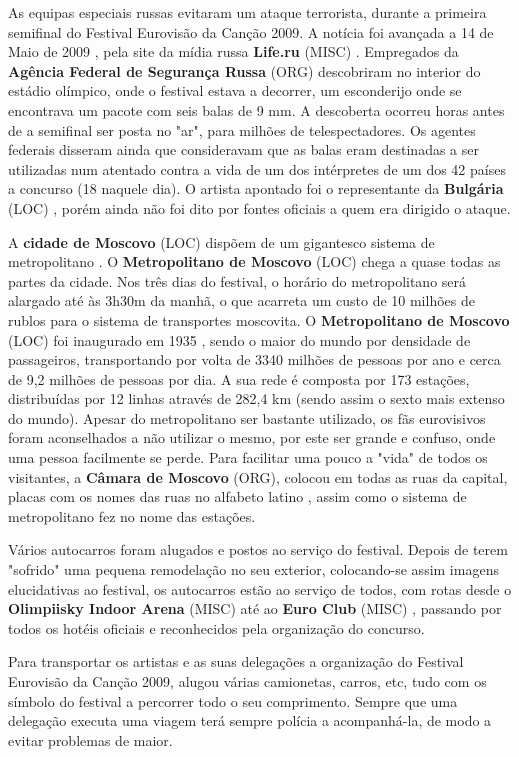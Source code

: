 \documentclass[12pt,a4paper]{article}
\begin{document}
As equipas especiais russas evitaram um ataque terrorista, durante a primeira semifinal do Festival Eurovisão da Canção 2009. A notícia foi avançada a 14 de Maio de 2009 , pela site da mídia russa \textbf{Life.ru} (MISC) . Empregados da \textbf{Agência Federal de Segurança Russa} (ORG) descobriram no interior do estádio olímpico, onde o festival estava a decorrer, um esconderijo onde se encontrava um pacote com seis balas de 9 mm. A descoberta ocorreu horas antes de a semifinal ser posta no "ar", para milhões de telespectadores. Os agentes federais disseram ainda que consideravam que as balas eram destinadas a ser utilizadas num atentado contra a vida de um dos intérpretes de um dos 42 países a concurso (18 naquele dia). O artista apontado foi o representante da \textbf{Bulgária} (LOC) , porém ainda não foi dito por fontes oficiais a quem era dirigido o ataque.

A \textbf{cidade de Moscovo} (LOC) dispõem de um gigantesco sistema de metropolitano . O \textbf{Metropolitano de Moscovo} (LOC) chega a quase todas as partes da cidade. Nos três dias do festival, o horário do metropolitano será alargado até às 3h30m da manhã, o que acarreta um custo de 10 milhões de rublos para o sistema de transportes moscovita. O \textbf{Metropolitano de Moscovo} (LOC) foi inaugurado em 1935 , sendo o maior do mundo por densidade de passageiros, transportando por volta de 3340 milhões de pessoas por ano e cerca de 9,2 milhões de pessoas por dia. A sua rede é composta por 173 estações, distribuídas por 12 linhas através de 282,4 km (sendo assim o sexto mais extenso do mundo). Apesar do metropolitano ser bastante utilizado, os fãs eurovisivos foram aconselhados a não utilizar o mesmo, por este ser grande e confuso, onde uma pessoa facilmente se perde. Para facilitar uma pouco a "vida" de todos os visitantes, a \textbf{Câmara de Moscovo} (ORG), colocou em todas as ruas da capital, placas com os nomes das ruas no alfabeto latino , assim como o sistema de metropolitano fez no nome das estações.

Vários autocarros foram alugados e postos ao serviço do festival. Depois de terem "sofrido" uma pequena remodelação no seu exterior, colocando-se assim imagens elucidativas ao festival, os autocarros estão ao serviço de todos, com rotas desde o \textbf{Olimpiisky Indoor Arena} (MISC) até ao \textbf{Euro Club} (MISC) , passando por todos os hotéis oficiais e reconhecidos pela organização do concurso.

Para transportar os artistas e as suas delegações a organização do Festival Eurovisão da Canção 2009, alugou várias camionetas, carros, etc, tudo com os símbolo do festival a percorrer todo o seu comprimento. Sempre que uma delegação executa uma viagem terá sempre polícia a acompanhá-la, de modo a evitar problemas de maior.
\end{document}
